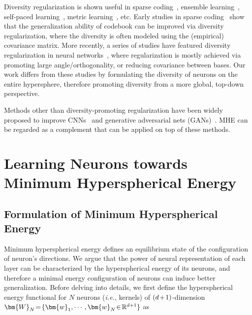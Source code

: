 Diversity regularization is shown useful in sparse coding~\cite{mairal2009online,ramirez2010classification}, ensemble learning~\cite{li2012diversity,kuncheva2003measures}, self-paced learning~\cite{jiang2014self}, metric learning~\cite{xie2018orthogonality}, etc. Early studies in sparse coding~\cite{mairal2009online,ramirez2010classification} show that the generalization ability of codebook can be improved via diversity regularization, where the diversity is often modeled using the (empirical) covariance matrix. More recently, a series of studies have featured diversity regularization in neural networks~\cite{xie2016diversity,xie2017uncorrelation,xie2017learning,cogswell2016reducing,rodriguez2017regularizing,xie2017all}, where regularization is mostly achieved via promoting large angle/orthogonality, or reducing covariance between bases. Our work differs from these studies by formulating the diversity of neurons on the entire hypersphere, therefore promoting diversity from a more global, top-down perspective.
\par

Methods other than diversity-promoting regularization have been widely proposed to improve CNNs~\cite{srivastava2014dropout,ioffe2015batch,mishkin2016all,liu2017hyper} and generative adversarial nets (GANs)~\cite{brock2017neural,miyato2018spectral}. MHE can be regarded as a complement that can be applied on top of these methods.

\section{Learning Neurons towards Minimum Hyperspherical Energy}

\subsection{Formulation of Minimum Hyperspherical Energy}

Minimum hyperspherical energy defines an equilibrium state of the configuration of neuron's directions. We argue that the power of neural representation of each layer can be characterized by the hyperspherical energy of its neurons, and therefore a minimal energy configuration of neurons can induce better generalization. Before delving into details, we first define the hyperspherical energy functional for $N$ neurons (\emph{i.e.}, kernels) of $\thickmuskip=2mu \medmuskip=2mu (d+1)$-dimension  $\thickmuskip=2mu \medmuskip=2mu \bm{W}_N=\{\bm{w}_1,\cdots,\bm{w}_N\in\mathbb{R}^{d+1}\}$ as

